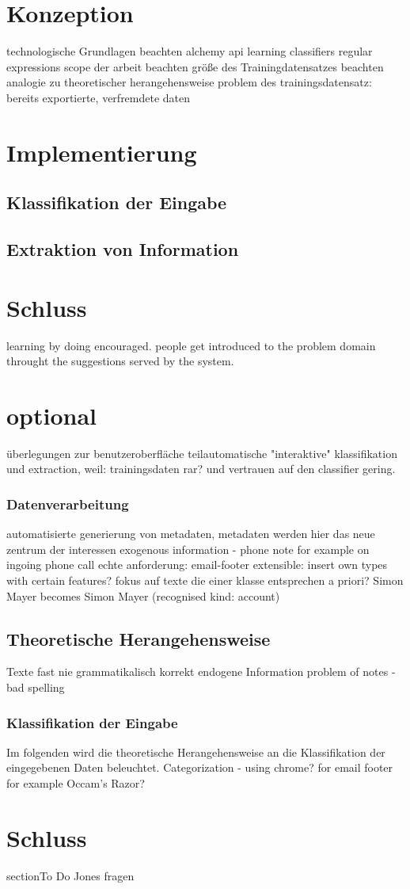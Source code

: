 \chapter{Konzeption}
technologische Grundlagen beachten
alchemy api
learning classifiers
regular expressions
scope der arbeit beachten
größe des Trainingdatensatzes beachten
analogie zu theoretischer herangehensweise
problem des trainingsdatensatz: bereits exportierte, verfremdete daten
\chapter{Implementierung}
\section{Klassifikation der Eingabe}
\section{Extraktion von Information}

\chapter{Schluss}
learning by doing encouraged. people get introduced to the problem domain throught the suggestions served by the system.


\chapter{optional}
überlegungen zur benutzeroberfläche
teilautomatische "interaktive" klassifikation und extraction, weil: trainingsdaten rar? und vertrauen auf den classifier gering.
\subsection{Datenverarbeitung}
automatisierte generierung von metadaten, metadaten werden hier das neue zentrum der interessen
exogenous information - phone note for example on ingoing phone call
echte anforderung: email-footer
extensible: insert own types with certain features?
fokus auf texte die einer klasse entsprechen
a priori?
Simon Mayer becomes Simon Mayer (recognised kind: account)
\section{Theoretische Herangehensweise}
Texte fast nie grammatikalisch korrekt
endogene Information
problem of notes - bad spelling
\subsection{Klassifikation der Eingabe}
Im folgenden wird die theoretische Herangehensweise an die Klassifikation der eingegebenen Daten beleuchtet.
Categorization - using chrome? for email footer for example
Occam's Razor?


\chapter{Schluss}


section{To Do}
Jones fragen

